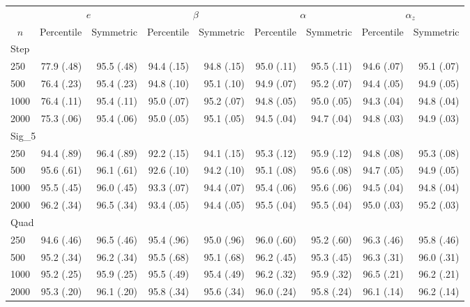 \begin{tabular}{lrrrrrrrr}
   \hline
 
       &  \multicolumn{2}{c}{$e$}    & \multicolumn{2}{c}{$\beta$}  & \multicolumn{2}{c}{$\alpha$}  & \multicolumn{2}{c}{$\alpha_z$} \\ 
         \multicolumn{1}{c}{$n$} & \multicolumn{1}{c}{Percentile}& \multicolumn{1}{c}{Symmetric}& \multicolumn{1}{c}{Percentile}& \multicolumn{1}{c}{Symmetric}& \multicolumn{1}{c}{Percentile}& \multicolumn{1}{c}{Symmetric}& \multicolumn{1}{c}{Percentile}& \multicolumn{1}{c}{Symmetric} \\ 
         \hline   
 \multicolumn{9}{l}{Step} \\ 
250 & 77.9 (.48) & 95.5 (.48) & 94.4 (.15) & 94.8 (.15) & 95.0 (.11) & 95.5 (.11) & 94.6 (.07) & 95.1 (.07) \\ 
  500 & 76.4 (.23) & 95.4 (.23) & 94.8 (.10) & 95.1 (.10) & 94.9 (.07) & 95.2 (.07) & 94.4 (.05) & 94.9 (.05) \\ 
  1000 & 76.4 (.11) & 95.4 (.11) & 95.0 (.07) & 95.2 (.07) & 94.8 (.05) & 95.0 (.05) & 94.3 (.04) & 94.8 (.04) \\ 
  2000 & 75.3 (.06) & 95.4 (.06) & 95.0 (.05) & 95.1 (.05) & 94.5 (.04) & 94.7 (.04) & 94.8 (.03) & 94.9 (.03) \\ 
       \hline   
 \multicolumn{9}{l}{Sig\_5} \\ 
250 & 94.4 (.89) & 96.4 (.89) & 92.2 (.15) & 94.1 (.15) & 95.3 (.12) & 95.9 (.12) & 94.8 (.08) & 95.3 (.08) \\ 
  500 & 95.6 (.61) & 96.1 (.61) & 92.6 (.10) & 94.2 (.10) & 95.1 (.08) & 95.6 (.08) & 94.7 (.05) & 94.9 (.05) \\ 
  1000 & 95.5 (.45) & 96.0 (.45) & 93.3 (.07) & 94.4 (.07) & 95.4 (.06) & 95.6 (.06) & 94.5 (.04) & 94.8 (.04) \\ 
  2000 & 96.2 (.34) & 96.5 (.34) & 93.4 (.05) & 94.4 (.05) & 95.5 (.04) & 95.5 (.04) & 95.0 (.03) & 95.2 (.03) \\ 
       \hline   
 \multicolumn{9}{l}{Quad} \\ 
250 & 94.6 (.46) & 96.5 (.46) & 95.4 (.96) & 95.0 (.96) & 96.0 (.60) & 95.2 (.60) & 96.3 (.46) & 95.8 (.46) \\ 
  500 & 95.2 (.34) & 96.2 (.34) & 95.5 (.68) & 95.1 (.68) & 96.2 (.45) & 95.3 (.45) & 96.3 (.31) & 96.0 (.31) \\ 
  1000 & 95.2 (.25) & 95.9 (.25) & 95.5 (.49) & 95.4 (.49) & 96.2 (.32) & 95.9 (.32) & 96.5 (.21) & 96.2 (.21) \\ 
  2000 & 95.3 (.20) & 96.1 (.20) & 95.8 (.34) & 95.6 (.34) & 96.0 (.24) & 95.8 (.24) & 96.1 (.14) & 96.2 (.14) \\ 
   \hline
\end{tabular}
